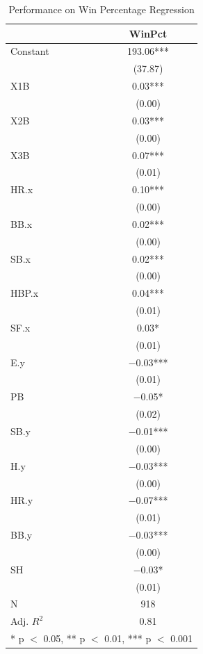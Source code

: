 \documentclass[
  12pt,
  letterpaper,
  DIV=11,
  numbers=noendperiod]{scrartcl}
\begin{document}
\hypertarget{tbl-WinPctSum}{}
\begin{table}
\caption{\label{tbl-WinPctSum}Performance on Win Percentage Regression }\tabularnewline

\centering
\begin{tabular}[t]{lc}
\toprule
  & WinPct\\
\midrule
Constant & \num{193.06}***\\
 & (\num{37.87})\\
X1B & \num{0.03}***\\
 & \vphantom{7} (\num{0.00})\\
X2B & \num{0.03}***\\
 & \vphantom{6} (\num{0.00})\\
X3B & \num{0.07}***\\
 & \vphantom{5} (\num{0.01})\\
HR.x & \num{0.10}***\\
 & \vphantom{5} (\num{0.00})\\
BB.x & \num{0.02}***\\
 & \vphantom{4} (\num{0.00})\\
SB.x & \num{0.02}***\\
 & \vphantom{3} (\num{0.00})\\
HBP.x & \num{0.04}***\\
 & \vphantom{4} (\num{0.01})\\
SF.x & \num{0.03}*\\
 & \vphantom{3} (\num{0.01})\\
E.y & \num{-0.03}***\\
 & \vphantom{2} (\num{0.01})\\
PB & \num{-0.05}*\\
 & (\num{0.02})\\
SB.y & \num{-0.01}***\\
 & \vphantom{2} (\num{0.00})\\
H.y & \num{-0.03}***\\
 & \vphantom{1} (\num{0.00})\\
HR.y & \num{-0.07}***\\
 & \vphantom{1} (\num{0.01})\\
BB.y & \num{-0.03}***\\
 & (\num{0.00})\\
SH & \num{-0.03}*\\
 & (\num{0.01})\\
\midrule
N & \num{918}\\
Adj. $R^2$ & \num{0.81}\\
\bottomrule
\multicolumn{2}{l}{\rule{0pt}{1em}* p $<$ 0.05, ** p $<$ 0.01, *** p $<$ 0.001}\\
\end{tabular}
\end{table}
\end{document}
